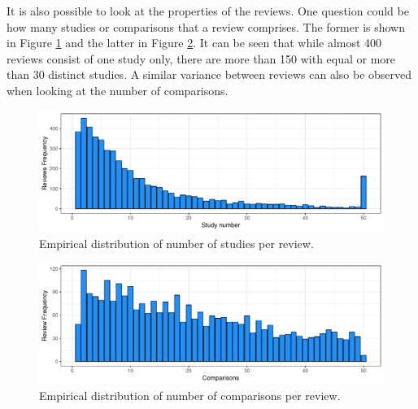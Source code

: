 \documentclass[11pt,a4paper,twoside]{book}\usepackage[]{graphicx}\usepackage[]{color}
\newenvironment{knitrout}{}{} %
\begin{document}
It is also possible to look at the properties of the reviews. One question could be how many studies or comparisons that a review comprises. The former is shown in Figure \ref{studies.per.review} and the latter in Figure \ref{comparisons.per.review}. It can be seen that while almost 400 reviews consist of one study only, there are more than 150 with equal or more than 30 distinct studies. A similar variance between reviews can also be observed when looking at the number of comparisons.

\begin{figure}
\begin{knitrout}
\color{fgcolor}

{\centering \includegraphics[width=\textwidth-3cm]{figure/ch02_figunnamed-chunk-10-1} 

}



\end{knitrout}
\caption{Empirical distribution of number of studies per review.}
\label{studies.per.review}
\end{figure}

\begin{figure}
\begin{knitrout}
\color{fgcolor}

{\centering \includegraphics[width=\textwidth-3cm]{figure/ch02_figunnamed-chunk-11-1} 

}



\end{knitrout}
\caption{Empirical distribution of number of comparisons per review.}
\label{comparisons.per.review}
\end{figure}
\end{document}
